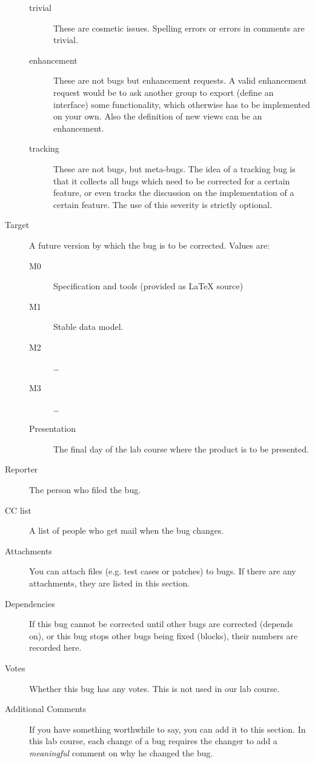 \documentclass[11pt,nologo,handout]{handout}
\begin{document}
\begin{description}
\begin{description}
  \item[trivial]  These are cosmetic issues.  Spelling errors or errors in
    comments are trivial.
  \item[enhancement]  These are not bugs but enhancement requests.  A valid
    enhancement request would be to ask another group to export (define an
    interface) some functionality, which otherwise has to be implemented on
    your own.  Also the definition of new views can be an enhancement.
  \item[tracking]  These are not bugs, but meta-bugs.  The idea of a
    tracking bug is that it collects all bugs which need to be corrected
    for a certain feature, or even tracks the discussion on the
    implementation of a certain feature.  The use of this severity is
    strictly optional.
  \end{description}
\item[Target]  A future version by which the bug is to be corrected.
  Values are:
  \begin{description}
  \item[M0] Specification and tools (provided as \LaTeX{} source)
  \item[M1] Stable data model.
  \item[M2] \ldots
  \item[M3] \ldots
  \item[Presentation]  The final day of the lab course where the product
    is to be presented.
  \end{description}
\item[Reporter]  The person who filed the bug.
\item[CC list]  A list of people who get mail when the bug changes.
\item[Attachments]  You can attach files (e.g. test cases or patches) to
  bugs.  If there are any attachments, they are listed in this section.
\item[Dependencies]  If this bug cannot be corrected until other bugs are
  corrected (depends on), or this bug stops other bugs being fixed (blocks),
  their numbers are recorded here.
\item[Votes]  Whether this bug has any votes.  This is not used in our
  lab course.
\item[Additional Comments]  If you have something worthwhile to say, you
  can add it to this section.  In this lab course, each change of a bug
  requires the changer to add a \emph{meaningful} comment on why he
  changed the bug.
\end{description}
\end{document}

